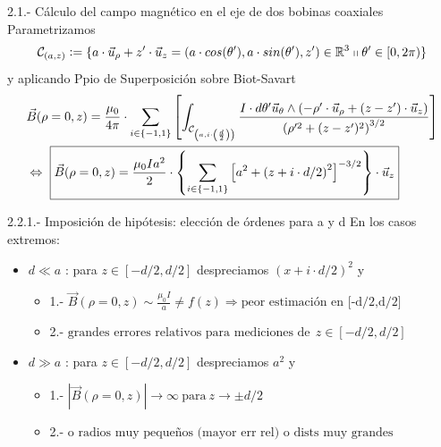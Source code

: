 \documentclass{beamer}
\makeatletter
\newcommand{\ifff}{\Leftrightarrow}
\newcommand{\imp}{\Rightarrow}
\providecommand{\abs}[1]{\left|#1\right|}
\newcommand{\commentedbox}[2]{%
  \mbox{
    \begin{tabular}[t]{@{}c@{}}
    $\boxed{\displaystyle#1}$\\
    #2
    \end{tabular}%
  }%
}
\newcommand{\defeq}{\vcentcolon=}
\makeatother
\begin{document}
\begin{frame}{2.1.- Cálculo del campo magnético en el eje de dos bobinas coaxiales}
    Parametrizamos
    \begin{equation}
        \mathcal{C}_{(a,z)} \defeq \{ a \cdot \vec{u}_{\rho} + z' \cdot \vec{u}_{z} = \left( a \cdot cos(\theta') , a \cdot sin(\theta'), z' \right) \in \mathbb{R}^{3} \shortparallel \theta' \in [0,2\pi) \} \nonumber
    \end{equation}
    \pause y aplicando Ppio de Superposición sobre Biot-Savart
    \begin{align*}
        & \vec{B}(\rho = 0, z) = \frac{\mu_{0}}{4 \pi} \cdot \sum_{i \in \{-1,1\}} \left[\int_{\mathcal{C}_{\left(a,i \cdot \left( \frac{d}{2} \right) \right)}} \frac{I \cdot d\theta' \vec{u}_{\theta} \wedge (- \rho' \cdot \vec{u}_{\rho} + (z-z') \cdot \vec{u}_{z})}{\left( \rho'^{2} + (z-z')^{2} \right)^{3/2}} \right] \\
        & \ifff \commentedbox{\vec{B}(\rho = 0, z) = \frac{\mu_{0}I a^{2}}{2} \cdot \left\{ \sum_{i \in \{-1,1\}} \left[ a^{2} + \left( z + i \cdot d/2 \right)^{2} \right]^{- 3/2} \right\} \cdot \vec{u}_{z}}{}\nonumber
    \end{align*}
\end{frame}
\begin{frame}{2.2.1.- Imposición de hipótesis: elección de órdenes para a y d}
    En los casos extremos:
    \begin{itemize}
        \item $d \ll a $ : para $z \in [-d/2,d/2]$ despreciamos $(x + i \cdot d/2)^{2}$ y \pause
        \begin{itemize}
            \item 1.- $\vec{B}(\rho = 0, z) \sim \frac{\mu_{0} I }{a} \neq f(z) \imp \text{peor estimación en [-d/2,d/2]}$
            \item 2.- $\text{grandes errores relativos para mediciones de}~~z \in [-d/2,d/2]$
        \end{itemize}
\pause
        \item $d \gg a$ : para $z \in [-d/2,d/2]$ despreciamos $a^{2}$ y \pause
          \begin{itemize}
             \item 1.- $\abs{\vec{B}(\rho = 0, z)} \rightarrow \infty ~\text{para}~ z \rightarrow \pm d/2$
             \item 2.- $\text{o radios muy pequeños (mayor err rel) o dists muy grandes}$
          \end{itemize}
    \end{itemize}
\end{frame}
\end{document}
